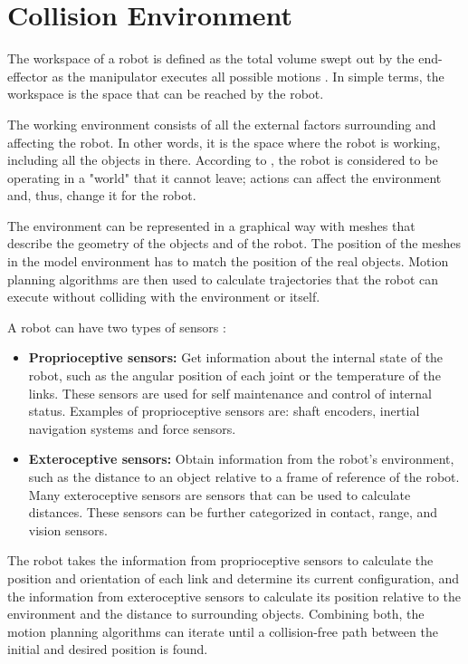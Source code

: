 \section{Collision Environment}

The workspace of a robot is defined as the total volume swept out by the end-effector as the manipulator executes all possible motions \citep[chap. 1]{Handbook}. In simple terms, the workspace is the space that can be reached by the robot.

The working environment consists of all the external factors surrounding and affecting the robot. In other words, it is the space where the robot is working, including all the objects in there. According to \citet{Taskspace}, the robot is considered to be operating in a "world" that it cannot leave; actions can affect the environment and, thus, change it for the robot. 

The environment can be represented in a graphical way with meshes that describe the geometry of the objects and of the robot. The position of the meshes in the model environment has to match the position of the real objects. Motion planning algorithms are then used to calculate trajectories that the robot can execute without colliding with the environment or itself. 

A robot can have two types of sensors \citep[chap. 1]{Russel}:
\begin{itemize}
	\item \textbf{Proprioceptive sensors:} Get information about the internal state of the robot, such as the angular position of each joint or the temperature of the links. These sensors are used for self maintenance and control of internal status. Examples of proprioceptive sensors are: shaft encoders, inertial navigation systems and force sensors.
	\item \textbf{Exteroceptive sensors:} Obtain information from the robot's environment, such as the distance to an object relative to a frame of reference of the robot. Many exteroceptive sensors are sensors that can be used to calculate distances. These sensors can be further categorized in contact, range, and vision sensors.
\end{itemize}

The robot takes the information from proprioceptive sensors to calculate the position and orientation of each link and determine its current configuration, and the information from exteroceptive sensors to calculate its position relative to the environment and the distance to surrounding objects. Combining both, the motion planning algorithms can iterate until a collision-free path between the initial and desired position is found.

